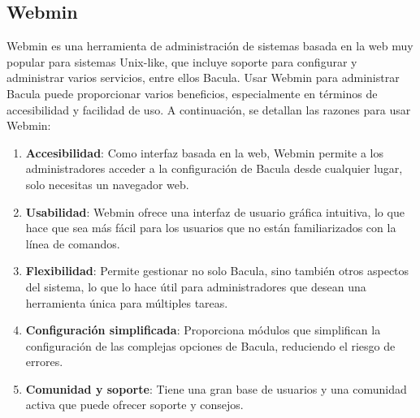 \subsection{Webmin}  

Webmin es una herramienta de administración de sistemas basada en la web muy popular para sistemas Unix-like, que incluye soporte para configurar y administrar varios servicios, entre ellos Bacula. Usar Webmin para administrar Bacula puede proporcionar varios beneficios, especialmente en términos de accesibilidad y facilidad de uso. A continuación, se detallan las razones para usar Webmin:

\begin{enumerate}
    \item \textbf{Accesibilidad}: Como interfaz basada en la web, Webmin permite a los administradores acceder a la configuración de Bacula desde cualquier lugar, solo necesitas un navegador web.
    \item \textbf{Usabilidad}: Webmin ofrece una interfaz de usuario gráfica intuitiva, lo que hace que sea más fácil para los usuarios que no están familiarizados con la línea de comandos.
    \item \textbf{Flexibilidad}: Permite gestionar no solo Bacula, sino también otros aspectos del sistema, lo que lo hace útil para administradores que desean una herramienta única para múltiples tareas.
    \item \textbf{Configuración simplificada}: Proporciona módulos que simplifican la configuración de las complejas opciones de Bacula, reduciendo el riesgo de errores.
    \item \textbf{Comunidad y soporte}: Tiene una gran base de usuarios y una comunidad activa que puede ofrecer soporte y consejos.
\end{enumerate}

